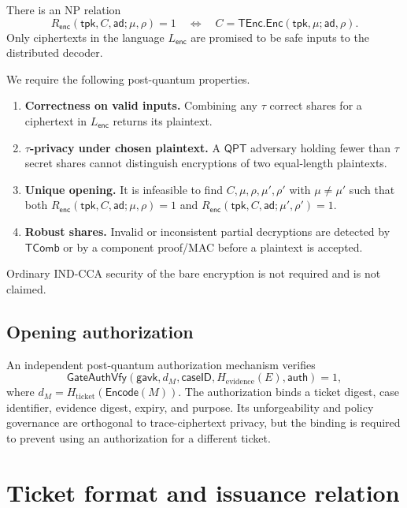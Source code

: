 \documentclass[11pt]{article}
\newcommand{\TEnc}{\mathsf{TEnc}}
\newcommand{\TComb}{\mathsf{TComb}}
\newcommand{\QPT}{\mathsf{QPT}}
\begin{document}
There is an NP relation
\[
 R_{\mathsf{enc}}(\mathsf{tpk},C,\mathsf{ad};\mu,\rho)=1
 \quad\Longleftrightarrow\quad
 C=\TEnc.\mathsf{Enc}(\mathsf{tpk},\mu;\mathsf{ad},\rho).
\]
Only ciphertexts in the language $L_{\mathsf{enc}}$ are promised to be safe
inputs to the distributed decoder.

We require the following post-quantum properties.

\begin{enumerate}[label=(T\arabic*),leftmargin=*]
  \item \textbf{Correctness on valid inputs.}  Combining any $\tau$ correct
  shares for a ciphertext in $L_{\mathsf{enc}}$ returns its plaintext.
  \item \textbf{$\tau$-privacy under chosen plaintext.}  A $\QPT$ adversary
  holding fewer than $\tau$ secret shares cannot distinguish encryptions of two
  equal-length plaintexts.
  \item \textbf{Unique opening.}  It is infeasible to find
  $C,\mu,\rho,\mu',\rho'$ with $\mu\neq\mu'$ such that both
  $R_{\mathsf{enc}}(\mathsf{tpk},C,\mathsf{ad};\mu,\rho)=1$ and
  $R_{\mathsf{enc}}(\mathsf{tpk},C,\mathsf{ad};\mu',\rho')=1$.
  \item \textbf{Robust shares.}  Invalid or inconsistent partial decryptions are
  detected by $\TComb$ or by a component proof/MAC before a plaintext is
  accepted.
\end{enumerate}

Ordinary IND-CCA security of the bare encryption is not required and is not
claimed.

\subsection{Opening authorization}

An independent post-quantum authorization mechanism verifies
\[
  \mathsf{GateAuthVfy}(\mathsf{gavk},d_M,\mathsf{caseID},
  H_{\mathrm{evidence}}(E),\mathsf{auth})=1,
\]
where $d_M=H_{\mathrm{ticket}}(\mathsf{Encode}(M))$.  The authorization binds a
ticket digest, case identifier, evidence digest, expiry, and purpose.  Its
unforgeability and policy governance are orthogonal to trace-ciphertext privacy,
but the binding is required to prevent using an authorization for a different
ticket.

\section{Ticket format and issuance relation}\label{sec:issue-relation}
\end{document}
